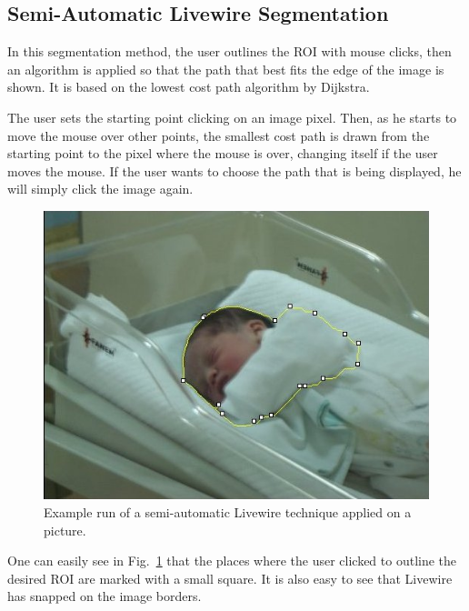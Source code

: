 \subsection{Semi-Automatic Livewire Segmentation}

In this segmentation method, the user outlines the \ac{ROI} with mouse clicks, then an algorithm is applied so that the path that best fits the edge of the image is shown. It is based on the lowest cost path algorithm by Dijkstra. 

The user sets the starting point clicking on an image pixel. Then, as he starts to move the mouse over other points, the smallest cost path is drawn from the starting point to the pixel where the mouse is over, changing itself if the user moves the mouse. If the user wants to choose the path that is being displayed, he will simply click the image again.

\begin{figure}
\centering
\includegraphics[scale=0.8]{figures/livewire_baby}
\caption[Semi-automatic Livewire segmentation]{Example run of a semi-automatic Livewire technique applied on a picture.}
\label{img:livewire_baby}
\end{figure}

One can easily see in Fig.~\ref{img:livewire_baby} that the places where the user clicked to outline the desired \ac{ROI} are marked with a small square. It is also easy to see that Livewire has snapped on the image borders.

